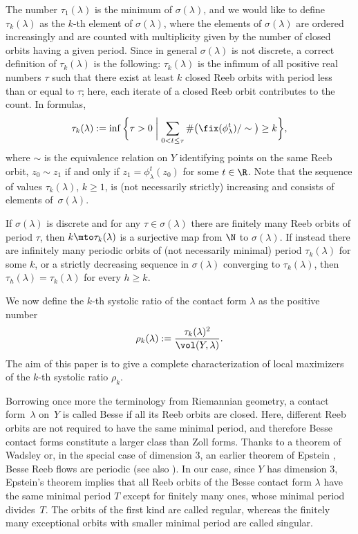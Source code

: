 The number $\tau_1(\lambda)$ is the minimum of $\sigma(\lambda)$, and we would like to define $\tau_k(\lambda)$ as the $k$-th element of $\sigma(\lambda)$, where the elements of $\sigma(\lambda)$ are ordered increasingly and are counted with multiplicity given by the number of closed orbits having a given period. Since in general $\sigma(\lambda)$ is not discrete, a correct definition of $\tau_k(\lambda)$ is the following: $\tau_k(\lambda)$ is the infimum of all positive real numbers $\tau$ such that there exist at least $k$ closed Reeb orbits with period less than or equal to $\tau$; here, each iterate of a closed Reeb orbit contributes to the count. In formulas,
\begin{equation}
\label{e:tau_k}
\tau_k(\lambda):=\inf\bigg\{\tau>0 \biggm| \sum_{0<t\leq\tau} \#\big(\fix(\phi_\lambda^t)/\sim\big)\geq k \bigg\},
\end{equation}
where $\sim$ is the equivalence relation on $Y$ identifying points on the same Reeb orbit, \ie $z_0\sim z_1$ if and only if $z_1=\phi_\lambda^t(z_0)$ for some $t\in\R$. Note that the sequence of values $\tau_k(\lambda)$, $k\geq1$, is (not necessarily strictly) increasing and consists of elements of~$\sigma(\lambda)$.

If $\sigma(\lambda)$ is discrete and for any $\tau \in \sigma(\lambda)$ there are finitely many Reeb orbits of period $\tau$, then $k\mto \tau_k(\lambda)$ is a surjective map from $\N$ to $\sigma(\lambda)$. If instead there are infinitely many periodic orbits of (not necessarily minimal) period $\tau_{k}(\lambda)$ for some $k$, or a strictly decreasing sequence in $\sigma(\lambda)$ converging to $\tau_{k}(\lambda)$, then $\tau_h(\lambda)=\tau_{k}(\lambda)$ for every $h\geq k$.

We now define the $k$-th systolic ratio of the contact form $\lambda$ as the positive number
\[
\rho_k(\lambda) := \frac{\tau_k(\lambda)^2}{\vol(Y,\lambda)}.
\]
The aim of this paper is to give a complete characterization of local maximizers of the $k$-th systolic ratio $\rho_k$.

Borrowing once more the terminology from Riemannian geometry, a contact form~$\lambda$ on~$Y$ is called Besse if all its Reeb orbits are closed. Here, different Reeb orbits are not required to have the same minimal period, and therefore Besse contact forms constitute a larger class than Zoll forms. Thanks to a theorem of Wadsley \cite{Wadsley:1975sp} or, in the special case of dimension $3$, an earlier theorem of Epstein \cite{Epstein:1972}, Besse Reeb flows are periodic (see also \cite{Sullivan:1978}). In our case, since $Y$ has dimension $3$, Epstein's theorem implies that all Reeb orbits of the Besse contact form $\lambda$ have the same minimal period $T$ except for finitely many ones, whose minimal period divides~$T$. The orbits of the first kind are called regular, whereas the finitely many exceptional orbits with smaller minimal period are called singular.

